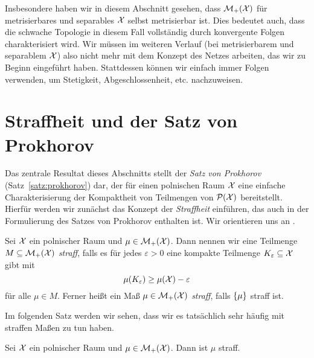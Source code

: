 \documentclass[../thesis/thesis.tex]{subfiles}
\begin{document}
	Insbesondere haben wir in diesem Abschnitt gesehen, dass $\mathcal{M}_{+}(\mathcal{X})$ für metrisierbares und separables $\mathcal{X}$ selbst metrisierbar ist. Dies bedeutet auch, dass die schwache Topologie
	in diesem Fall vollständig durch konvergente Folgen charakterisiert wird. Wir müssen im weiteren Verlauf (bei metrisierbarem und separablem $\mathcal{X}$) also nicht mehr mit dem Konzept des Netzes arbeiten, das wir zu Beginn eingeführt haben. Stattdessen
	können wir einfach immer Folgen verwenden, um Stetigkeit, Abgeschlossenheit, etc. nachzuweisen.

	\section{Straffheit und der Satz von Prokhorov}
	\label{subsec:straffheit_prokhorov}
	
	Das zentrale Resultat dieses Abschnitts stellt der \emph{Satz von Prokhorov} (Satz~\ref{satz:prokhorov}) dar, der für einen polnischen Raum $\mathcal{X}$ eine einfache Charakterisierung der Kompaktheit von Teilmengen von $\mathcal{P}(\mathcal{X})$ bereitstellt. Hierfür werden wir zunächst das Konzept der \emph{Straffheit} einführen, das auch in der Formulierung des Satzes von Prokhorov enthalten ist.
	Wir orientieren uns an \cite[Section 4.14]{Simon.2015}.
	
	\begin{Definition}
		Sei $\mathcal{X}$ ein polnischer Raum und $\mu \in \mathcal{M}_{+}(\mathcal{X})$. Dann nennen wir 
		eine Teilmenge $M \subseteq \mathcal{M}_{+}(\mathcal{X})$ \emph{straff}, falls es für jedes $\varepsilon > 0$ eine kompakte Teilmenge
		$K_\varepsilon \subseteq \mathcal{X}$ gibt mit 
		\[ \mu(K_\varepsilon) \geq \mu(\mathcal{X})  - \varepsilon \]
		für alle $\mu \in M$.
		Ferner heißt ein Maß $\mu \in \mathcal{M}_{+}(\mathcal{X})$ \emph{straff}, falls $\left\{\mu\right\}$ straff ist.
	\end{Definition}
	
	Im folgenden Satz werden wir sehen, dass wir es tatsächlich sehr häufig mit straffen Maßen zu tun haben.
	
	\begin{Satz}
		\label{satz:straffheit}
		Sei $\mathcal{X}$ ein polnischer Raum und $\mu \in \mathcal{M}_{+}(\mathcal{X})$. Dann ist $\mu$ straff.
	\end{Satz}
	
\end{document}

